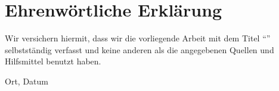 \clearpage
\chapter*{Ehrenwörtliche Erklärung}


Wir versichern hiermit, dass wir die vorliegende Arbeit mit dem Titel ``\textit{\DerTitelDerArbeit}'' selbstständig verfasst und keine anderen als die angegebenen Quellen und Hilfsmittel benutzt haben.

\vspace{3cm}
Ort, Datum \hfill 


